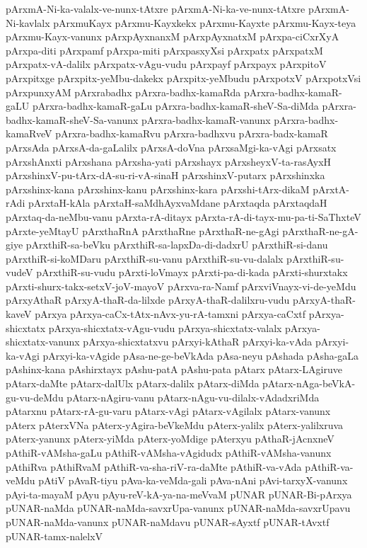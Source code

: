 {pArxmA-Ni-ka-valalx-ve-nunx-tAtxre
pArxmA-Ni-ka-ve-nunx-tAtxre
pArxmA-Ni-kavlalx
pArxmuKayx
pArxmu-Kayxkekx
pArxmu-Kayxte
pArxmu-Kayx-teya
pArxmu-Kayx-vanunx
pArxpAyxnanxM
pArxpAyxnatxM
pArxpa-ciCxrXyA
pArxpa-diti
pArxpamf
pArxpa-miti
pArxpasxyXsi
pArxpatx
pArxpatxM
pArxpatx-vA-dalilx
pArxpatx-vAgu-vudu
pArxpayf
pArxpayx
pArxpitoV
pArxpitxge
pArxpitx-yeMbu-dakekx
pArxpitx-yeMbudu
pArxpotxV
pArxpotxVsi
pArxpunxyAM
pArxrabadhx
pArxra-badhx-kamaRda
pArxra-badhx-kamaR-gaLU
pArxra-badhx-kamaR-gaLu
pArxra-badhx-kamaR-sheV-Sa-diMda
pArxra-badhx-kamaR-sheV-Sa-vanunx
pArxra-badhx-kamaR-vanunx
pArxra-badhx-kamaRveV
pArxra-badhx-kamaRvu
pArxra-badhxvu
pArxra-badx-kamaR
pArxsAda
pArxsA-da-gaLalilx
pArxsA-doVna
pArxsaMgi-ka-vAgi
pArxsatx
pArxshAnxti
pArxshana
pArxsha-yati
pArxshayx
pArxsheyxV-ta-rasAyxH
pArxshinxV-pu-tArx-dA-su-ri-vA-sinaH
pArxshinxV-putarx
pArxshinxka
pArxshinx-kana
pArxshinx-kanu
pArxshinx-kara
pArxshi-tArx-dikaM
pArxtA-rAdi
pArxtaH-kAla
pArxtaH-saMdhAyxvaMdane
pArxtaqda
pArxtaqdaH
pArxtaq-da-neMbu-vanu
pArxta-rA-ditayx
pArxta-rA-di-tayx-mu-pa-ti-SaThxteV
pArxte-yeMtayU
pArxthaRnA
pArxthaRne
pArxthaR-ne-gAgi
pArxthaR-ne-gA-giye
pArxthiR-sa-beVku
pArxthiR-sa-lapxDa-di-dadxrU
pArxthiR-si-danu
pArxthiR-si-koMDaru
pArxthiR-su-vanu
pArxthiR-su-vu-dalalx
pArxthiR-su-vudeV
pArxthiR-su-vudu
pArxti-loVmayx
pArxti-pa-di-kada
pArxti-shurxtakx
pArxti-shurx-takx-setxV-joV-mayoV
pArxva-ra-Namf
pArxviVnayx-vi-de-yeMdu
pArxyAthaR
pArxyA-thaR-da-lilxde
pArxyA-thaR-dalilxru-vudu
pArxyA-thaR-kaveV
pArxya
pArxya-caCx-tAtx-nAvx-yu-rA-tamxni
pArxya-caCxtf
pArxya-shicxtatx
pArxya-shicxtatx-vAgu-vudu
pArxya-shicxtatx-valalx
pArxya-shicxtatx-vanunx
pArxya-shicxtatxvu
pArxyi-kAthaR
pArxyi-ka-vAda
pArxyi-ka-vAgi
pArxyi-ka-vAgide
pAsa-ne-ge-beVkAda
pAsa-neyu
pAshada
pAsha-gaLa
pAshinx-kana
pAshirxtayx
pAshu-patA
pAshu-pata
pAtarx
pAtarx-LAgiruve
pAtarx-daMte
pAtarx-dalUlx
pAtarx-dalilx
pAtarx-diMda
pAtarx-nAga-beVkA-gu-vu-deMdu
pAtarx-nAgiru-vanu
pAtarx-nAgu-vu-dilalx-vAdadxriMda
pAtarxnu
pAtarx-rA-gu-varu
pAtarx-vAgi
pAtarx-vAgilalx
pAtarx-vanunx
pAterx
pAterxVNa
pAterx-yAgira-beVkeMdu
pAterx-yalilx
pAterx-yalilxruva
pAterx-yanunx
pAterx-yiMda
pAterx-yoMdige
pAterxyu
pAthaR-jAcnxneV
pAthiR-vAMsha-gaLu
pAthiR-vAMsha-vAgidudx
pAthiR-vAMsha-vanunx
pAthiRva
pAthiRvaM
pAthiR-va-sha-riV-ra-daMte
pAthiR-va-vAda
pAthiR-va-veMdu
pAtiV
pAvaR-tiyu
pAva-ka-veMda-gali
pAva-nAni
pAvi-tarxyX-vanunx
pAyi-ta-mayaM
pAyu
pAyu-reV-kA-ya-na-meVvaM
pUNAR
pUNAR-Bi-pArxya
pUNAR-naMda
pUNAR-naMda-savxrUpa-vanunx
pUNAR-naMda-savxrUpavu
pUNAR-naMda-vanunx
pUNAR-naMdavu
pUNAR-sAyxtf
pUNAR-tAvxtf
pUNAR-tamx-nalelxV
}
